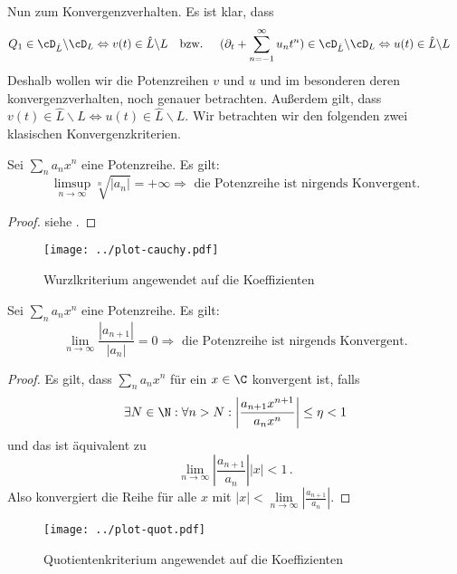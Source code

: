 Nun zum Konvergenzverhalten. Es ist klar, dass
\begin{align*}
Q_1\in\cD_{\hat L} \backslash\cD_L &\Leftrightarrow v(t) \in\hat L \backslash L
&\mbox{bzw. } & &
(\partial_t + \sum_{n=-1}^\infty u_nt^n)\in \cD_{\hat L} \backslash \cD_L
&\Leftrightarrow u(t) \in \hat L \backslash L
\end{align*}
Deshalb wollen wir die Potenzreihen $v$ und $u$ und im besonderen deren
konvergenzverhalten, noch genauer betrachten.
Außerdem gilt, dass $ v(t) \in\hat L \backslash L \Leftrightarrow u(t) \in \hat
L \backslash L$.
Wir betrachten wir den folgenden zwei klasischen Konvergenzkriterien.
\begin{thm} \label{thm:convKrit}
Sei $\sum_n a_n x^n$ eine Potenzreihe. Es gilt:
\[
\underset{n\rightarrow\infty}{\limsup} \sqrt[n]{|a_n|} = +\infty
\Rightarrow \text{ die Potenzreihe ist nirgends Konvergent.}
\]
\end{thm}
\begin{proof}
siehe \cite[§18, Satz 94]{KnoppReihen}.
\end{proof}
\begin{figure}[htbp]
  \centering
  \texttt{[image: ../plot-cauchy.pdf]}
  \caption{Wurzlkriterium angewendet auf die Koeffizienten}
  \label{fig:plotCauchyKoeffs}
\end{figure}
\begin{thm}[Quotientenkriterium]
Sei $\sum_n a_n x^n$ eine Potenzreihe. Es gilt:
\[
\underset{n\rightarrow\infty}{\lim} \frac{|a_{n+1}|}{|a_n|} = 0
\Rightarrow \text{ die Potenzreihe ist nirgends Konvergent.}
\]
\end{thm}
\begin{proof}
Es gilt, dass $\sum_na_nx^n$ für ein $x\in\C$ konvergent ist, falls
\[
\exists N\in\N:\forall n>N:\left|\frac{a_{n+1}x^{n+1}}{a_nx^n}\right|\leq\eta<1
\]
und das ist äquivalent zu
\[
\underset{n\rightarrow\infty}{\lim} \left|\frac{a_{n+1}}{a_n}\right||x| < 1 \,.
\]
Also konvergiert die Reihe für alle $x$ mit
$|x|<\underset{n\rightarrow\infty}{\lim} \left|\frac{a_{n+1}}{a_n}\right|$.
\end{proof}
\begin{figure}[htbp]
  \centering
  \texttt{[image: ../plot-quot.pdf]}
  \caption{Quotientenkriterium angewendet auf die Koeffizienten}
  \label{fig:plotQuotKoeffs}
\end{figure}

